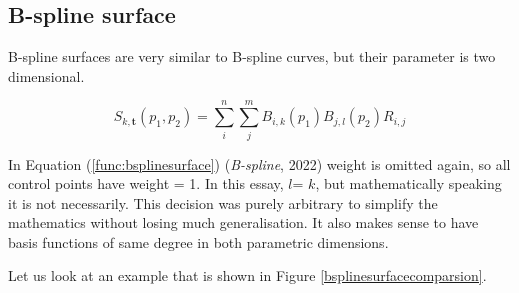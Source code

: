 \documentclass{article}
\begin{document}
\subsection{B-spline surface}

\vspace{6pt}
B-spline surfaces are very similar to B-spline curves, but their parameter is two dimensional.

\begin{equation}
S_{k,\mathbf{t}}(p_1, p_2) = \sum_{i}^n\sum_{j}^m B_{i,k}(p_1)B_{j,l}(p_2) R_{i,j}
\label{func:bsplinesurface}
\end{equation}

In Equation (\ref{func:bsplinesurface}) (\emph{B-spline}, 2022) weight is omitted again, so all control points have weight = 1. In this essay, $l$= $k$, but mathematically speaking it is not necessarily. This decision was purely arbitrary to simplify the mathematics without losing much generalisation. It also makes sense to have basis functions of same degree in both parametric dimensions.

Let us look at an example that is shown in Figure \ref{bsplinesurfacecomparsion}.
\end{document}
